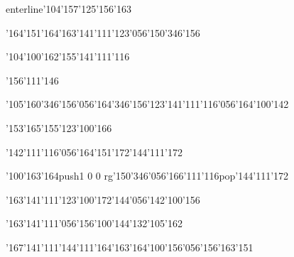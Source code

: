 enterline{\enskip\enskip\enskip\enskip\char'104\char'157\char'125\char'156\char'163\enskip\enskip\enskip\enskip\enskip\enskip\enskip\enskip\enskip}\medskip\centerline{\enskip\enskip\enskip\enskip\char'164\char'151\enskip\enskip\char'164\char'163\char'141\char'111\char'123\char'056\char'150\char'346\char'156}\medskip\centerline{\enskip\char'104\char'100\char'162\enskip\enskip\enskip\enskip\char'155\char'141\char'111\char'116}\medskip\centerline{\enskip\enskip\enskip\enskip\enskip\enskip\enskip\char'156\char'111\char'146}\medskip\centerline{\enskip\enskip\enskip\enskip\char'105\enskip\char'160\char'346\char'156\char'056\char'164\char'346\char'156\enskip\char'123\char'141\char'111\char'116\char'056\char'164\char'100\char'142}\medskip\centerline{\enskip\char'153\char'165\char'155\enskip\enskip\enskip\enskip\enskip\enskip\enskip\enskip\enskip\enskip\char'123\char'100\char'166}\medskip\centerline{\enskip\char'142\char'111\char'116\char'056\char'164\char'151\char'172\enskip\enskip\enskip\enskip\enskip\enskip\char'144\char'111\char'172}\medskip\centerline{\enskip\char'100\char'163\char'164\enskip\pdfcolorstack\match push{1 0 0 rg}\char'150\char'346\char'056\char'166\char'111\char'116\pdfcolorstack\match pop{}\enskip\char'144\char'111\char'172}\medskip\centerline{\enskip\char'163\char'141\char'111\enskip\char'123\char'100\char'172\char'144\char'056\char'142\char'100\char'156\enskip\enskip\enskip\enskip}\medskip\centerline{\enskip\enskip\enskip\enskip\char'163\char'141\char'111\char'056\char'156\char'100\char'144\enskip\char'132\char'105\char'162}\medskip\centerline{\enskip\char'167\char'141\char'111\enskip\char'144\char'111\char'164\char'163\char'164\enskip\enskip\enskip\enskip\char'100\char'156\char'056\char'156\char'163\char'151}\medskip\vfill\footline{\hfil\tt\folio\hfil}\eject

